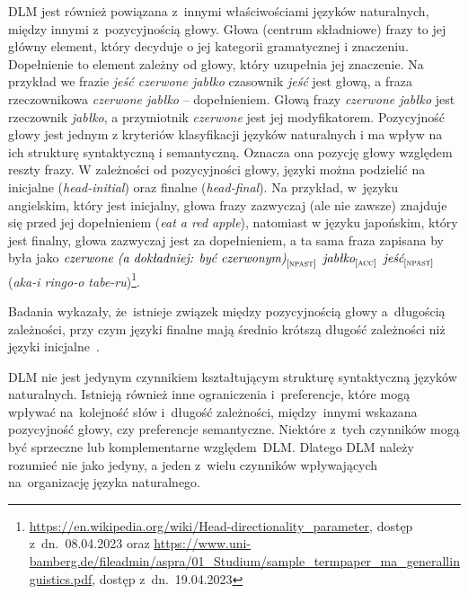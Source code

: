 \documentclass[licencjacka]{pracamgr_Kogni}
\begin{document}
    DLM jest również powiązana z~innymi właściwościami języków naturalnych, między innymi z~pozycyjnością głowy.
    Głowa (centrum składniowe) frazy to jej główny element, który decyduje o jej kategorii gramatycznej i znaczeniu.
    Dopełnienie to element zależny od głowy, który uzupełnia jej znaczenie.
    Na przykład we frazie \textit{jeść czerwone jabłko} czasownik \textit{jeść} jest głową, a fraza rzeczownikowa \textit{czerwone jabłko} -- dopełnieniem.
    Głową frazy \textit{czerwone jabłko} jest rzeczownik \textit{jabłko}, a przymiotnik \textit{czerwone} jest jej modyfikatorem.
    Pozycyjność głowy jest jednym z kryteriów klasyfikacji języków naturalnych i ma wpływ na ich strukturę syntaktyczną i semantyczną.
    Oznacza ona pozycję głowy względem reszty frazy.
    W zależności od pozycyjności głowy, języki można podzielić na inicjalne (\textit{head-initial}) oraz finalne (\textit{head-final}). Na przykład, w~języku angielskim, który jest inicjalny, głowa frazy zazwyczaj (ale nie zawsze) znajduje się przed jej dopełnieniem (\textit{eat a red apple}), natomiast w języku japońskim, który jest finalny, głowa zazwyczaj jest za dopełnieniem, a ta sama fraza zapisana by była jako $\textit{czerwone (a dokładniej: być czerwonym)}_{[\textsc{npast}]}$ $\textit{jabłko}_{[\textsc{acc}]}$ $\textit{jeść}_{[\textsc{npast}]}$ (\textit{aka-i ringo-o tabe-ru})\footnote{\url{https://en.wikipedia.org/wiki/Head-directionality_parameter}, dostęp z~dn.~08.04.2023 oraz \url{https://www.uni-bamberg.de/fileadmin/aspra/01_Studium/sample_termpaper_ma_generallinguistics.pdf}, dostęp z~dn.~19.04.2023}.

    Badania wykazały, że~istnieje związek między pozycyjnością głowy a~długością zależności, przy czym języki finalne mają średnio krótszą długość zależności niż języki inicjalne~\citep{FutrellEtAl2015}.

    DLM nie jest jedynym czynnikiem kształtującym strukturę syntaktyczną języków naturalnych.
    Istnieją również inne ograniczenia i~preferencje, które mogą wpływać na~kolejność słów i~długość zależności, między~innymi wskazana pozycyjność głowy, czy preferencje semantyczne.
    Niektóre z~tych czynników mogą być sprzeczne lub komplementarne względem~DLM. Dlatego DLM należy rozumieć nie jako jedyny, a jeden z~wielu czynników wpływających na~organizację języka naturalnego.
\end{document}
